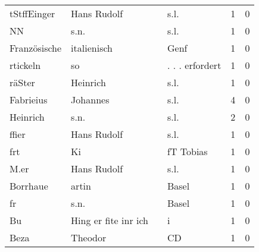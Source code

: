\begin{center}
\begin{tiny}
\begin{longtabu}{llllrr}
              tStffEinger &                        Hans Rudolf &             &                                        s.l. &          1 &         0 \\
                       NN &                               s.n. &             &                                        s.l. &          1 &         0 \\
             Französische &                        italienisch &             &                                        Genf &          1 &         0 \\
                 rtickeln &                                 so &             &                             . . . erfordert &          1 &         0 \\
                   räSter &                           Heinrich &             &                                        s.l. &          1 &         0 \\
                Fabrieius &                           Johannes &             &                                        s.l. &          4 &         0 \\
                 Heinrich &                               s.n. &             &                                        s.l. &          2 &         0 \\
                    ffier &                        Hans Rudolf &             &                                        s.l. &          1 &         0 \\
                      frt &                                 Ki &             &                                   fT Tobias &          1 &         0 \\
                     M.er &                        Hans Rudolf &             &                                        s.l. &          1 &         0 \\
                 Borrhaue &                              artin &             &                                       Basel &          1 &         0 \\
                       fr &                               s.n. &             &                                       Basel &          1 &         0 \\
                       Bu &               Hing er fite inr ich &             &                                           i &          1 &         0 \\
                     Beza &                            Theodor &             &                                          CD &          1 &         0 \\

\end{longtabu}
\end{tiny}
\end{center}
